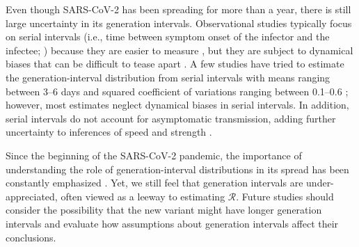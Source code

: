 \documentclass[12pt]{article}
\newcommand{\RR}{\ensuremath{{\mathcal R}}\xspace}
\begin{document}
Even though SARS-CoV-2 has been spreading for more than a year, there is still large uncertainty in its generation intervals.
Observational studies typically focus on serial intervals (i.e., time between symptom onset of the infector and the infectee; \cite{svensson2007note}) because they are easier to measure \citep{griffin2020rapid}, but they are subject to dynamical biases that can be difficult to tease apart \citep{park2021forward}.
A few studies have tried to estimate the generation-interval distribution from serial intervals with means ranging between 3--6 days and squared coefficient of variations ranging between 0.1--0.6 \citep{ferretti2020quantifying,Ferretti2020timing,ganyani2020estimating,knight2020estimating}; 
however, most estimates neglect dynamical biases in serial intervals.
In addition, serial intervals do not account for asymptomatic transmission, adding further uncertainty to inferences of speed and strength \citep{park2020time}.

Since the beginning of the SARS-CoV-2 pandemic, the importance of understanding the role of generation-interval distributions in its spread has been constantly emphasized \citep{doi:10.1098/rsif.2020.0144}.
Yet, we still feel that generation intervals are under-appreciated, often viewed as a leeway to estimating $\RR$.
Future studies should consider the possibility that the new variant might have longer generation intervals and evaluate how assumptions about generation intervals affect their conclusions.


\end{document}
